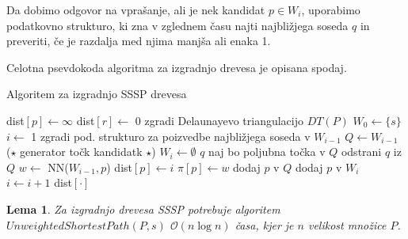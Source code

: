 \documentclass[a4paper, 12pt]{book}
\newcommand{\OO}{\ensuremath{\mathcal{O}}} %
\newtheorem{lema}[izrek]{Lema}
\begin{document}
Da dobimo odgovor na vprašanje, ali je nek kandidat $p\in W_i$, uporabimo podatkovno strukturo, ki zna v zglednem času najti najbližjega soseda $q$ in preveriti, če je razdalja med njima manjša ali enaka 1.

Celotna psevdokoda algoritma za izgradnjo drevesa je opisana spodaj.

\makeatletter
\def\BState{\State\hskip-\ALG@thistlm}
\makeatother

\begin{algorithm}
\caption{Algoritem za izgradnjo SSSP drevesa}\label{euclid}
\begin{algorithmic}[1]
\State dist$[p] \gets \infty$
\EndFor
\State dist$[r] \gets$ 0
\State zgradi Delaunayevo triangulacijo $DT(P)$
\State $W_{0} \gets \{ s \}$
\State $i \gets$ 1
\State zgradi pod. strukturo za poizvedbe najbližjega soseda v $W_{i-1}$
\State $Q \gets W_{i-1}$ ($\star$ generator točk kandidatk $\star$)
\State $W_{i} \gets \emptyset$
\State $q$ naj bo poljubna točka v $Q$
\State odstrani $q$ iz $Q$
\State $w \gets$ NN($W_{i-1},p$)
\State dist$[p] \gets i$
\State $\pi[p] \gets w$
\State dodaj $p$ v $Q$
\State dodaj $p$ v $W_{i}$
\EndIf
\EndFor
\EndWhile
\State $i \gets i + 1$
\EndWhile
\State \Return dist$[\cdot]$
\EndProcedure
\end{algorithmic}
\end{algorithm}

\begin{lema}
\label{lema3}
Za izgradnjo drevesa SSSP potrebuje algoritem $UnweightedShortestPath(P,s)$ $\OO(n\log n)$ časa, kjer je $n$ velikost množice $P$.
\end{lema}
\end{document}
